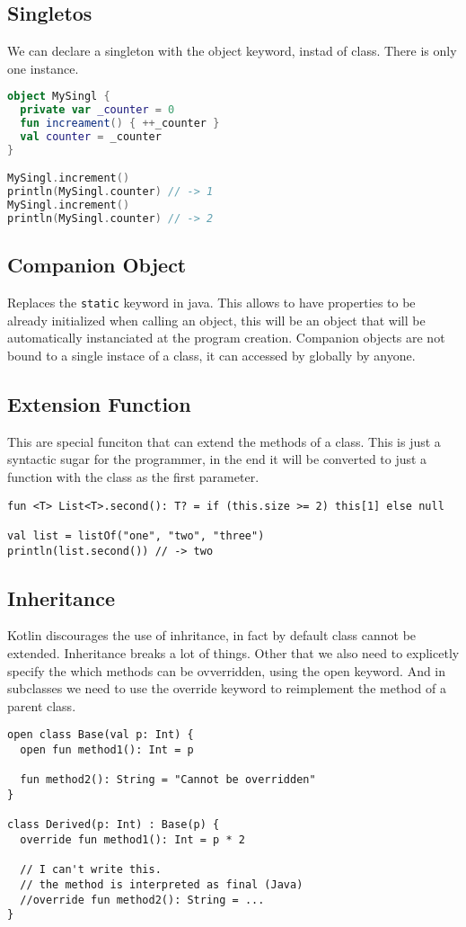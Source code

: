 \documentclass[12pt]{article}
\begin{document}
\subsection{Singletos}
We can declare a singleton with the object keyword, instad of class. There is only one instance.
\begin{lstlisting}[language=kotlin]
object MySingl {
  private var _counter = 0
  fun increament() { ++_counter }
  val counter = _counter
}

MySingl.increment()
println(MySingl.counter) // -> 1
MySingl.increment()
println(MySingl.counter) // -> 2
\end{lstlisting}


\subsection{Companion Object}
Replaces the \texttt{static} keyword in java. This allows to have properties to be already initialized when calling an object, this will be an object that will be automatically instanciated at the program creation. Companion objects are not bound to a single instace of a class, it can accessed by globally by anyone.


\subsection{Extension Function}
This are special funciton that can extend the methods of a class. This is just a syntactic sugar for the programmer, in the end it will be converted to just a function with the class as the first parameter.

\begin{lstlisting}
fun <T> List<T>.second(): T? = if (this.size >= 2) this[1] else null

val list = listOf("one", "two", "three")
println(list.second()) // -> two
\end{lstlisting}


\subsection{Inheritance}
Kotlin discourages the use of inhritance, in fact by default class cannot be extended. Inheritance breaks a lot of things. Other that we also need to explicetly specify the which methods can be ovverridden, using the open keyword. And in subclasses we need to use the override keyword to reimplement the method of a parent class.

\begin{lstlisting}
open class Base(val p: Int) {
  open fun method1(): Int = p

  fun method2(): String = "Cannot be overridden"
}

class Derived(p: Int) : Base(p) {
  override fun method1(): Int = p * 2

  // I can't write this.
  // the method is interpreted as final (Java)
  //override fun method2(): String = ...
}
\end{lstlisting}
\end{document}
